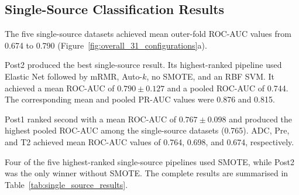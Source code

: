 \documentclass[12pt,twocolumn]{article}
\begin{document}
\subsection{Single-Source Classification Results}
\label{subsec:single_source_results}

The five single-source datasets achieved mean outer-fold ROC-AUC values
from 0.674 to 0.790
(Figure~\ref{fig:overall_31_configurations}a).

Post2 produced the best single-source result. Its highest-ranked
pipeline used Elastic Net followed by mRMR, Auto-\(k\), no SMOTE, and
an RBF SVM. It achieved a mean ROC-AUC of
\(0.790 \pm 0.127\) and a pooled ROC-AUC of 0.744. The corresponding
mean and pooled PR-AUC values were 0.876 and 0.815.

Post1 ranked second with a mean ROC-AUC of
\(0.767 \pm 0.098\) and produced the highest pooled ROC-AUC among the
single-source datasets (0.765). ADC, Pre, and T2 achieved mean
ROC-AUC values of 0.764, 0.698, and 0.674, respectively.

Four of the five highest-ranked single-source pipelines used SMOTE,
while Post2 was the only winner without SMOTE. The complete results
are summarised in Table~\ref{tab:single_source_results}.
\end{document}
